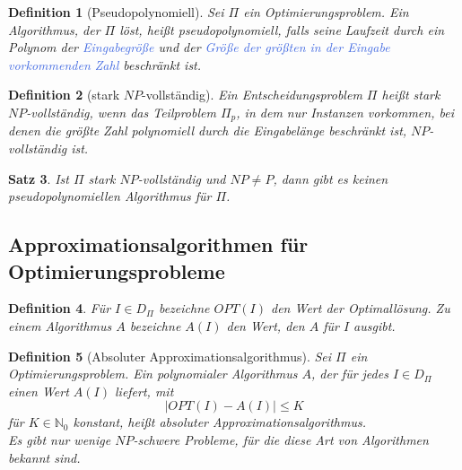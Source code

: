 \documentclass[11pt]{scrartcl}
\newcommand{\tcol}[1]{\textcolor{RoyalBlue}{#1}}
\theoremstyle{break}
\newtheorem{satz}{Satz}[section]
\newtheorem{defi}[satz]{Definition}
\begin{document}
    \begin{defi}[Pseudopolynomiell]
        Sei $\Pi$ ein Optimierungsproblem.
        Ein Algorithmus, der $\Pi$ löst, heißt pseudopolynomiell, falls seine Laufzeit durch ein Polynom der \tcol{Eingabegröße} und der \tcol{Größe der größten in der Eingabe vorkommenden Zahl} beschränkt ist.
    \end{defi}

    \begin{defi}[stark $NP$-vollständig]
        Ein Entscheidungsproblem $\Pi$ heißt stark $NP$-vollständig, wenn das Teilproblem $\Pi_p$, in dem nur Instanzen vorkommen, bei denen die größte Zahl polynomiell durch die Eingabelänge beschränkt ist, $NP$-vollständig ist.
    \end{defi}

    \begin{satz}
        Ist $\Pi$ stark $NP$-vollständig und $NP\neq P$, dann gibt es keinen pseudopolynomiellen Algorithmus für $\Pi$.
    \end{satz}


    \subsection{Approximationsalgorithmen
	 für Optimierungsprobleme}\label{subsec:approximationsalgorithmenindexfür-optimierungsprobleme}

    \begin{defi}
        Für $I\in D_\Pi$ bezeichne $OPT(I)$ den Wert der Optimallösung.
        Zu einem Algorithmus $A$ bezeichne $A(I)$ den Wert, den $A$ für $I$ ausgibt.
    \end{defi}

    \begin{defi}[Absoluter Approximationsalgorithmus]
        Sei $\Pi$ ein Optimierungsproblem.
        Ein polynomialer Algorithmus $A$, der für jedes $I\in D_\Pi$ einen Wert $A(I)$ liefert, mit
        \[|OPT(I)-A(I)|\leq K\]
        für $K\in\mathbb{N}_0$ konstant, heißt absoluter Approximationsalgorithmus.\\
        Es gibt nur wenige $NP$-schwere Probleme, für die diese Art von Algorithmen bekannt sind.
    \end{defi}
\end{document}
